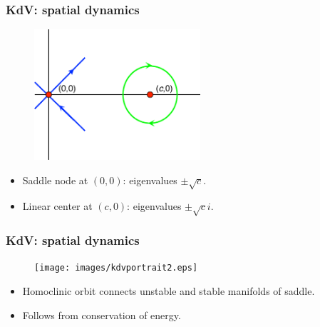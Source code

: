 \documentclass[16pt]{beamer}
\begin{document}
\begin{frame}
\frametitle{KdV: spatial dynamics}
\fontsize{16}{7.2}\selectfont
\begin{figure}[H]
\includegraphics[width=0.55\textwidth]{images/kdv3portrait1.eps}
\end{figure}
\begin{itemize}
\item Saddle node at $(0,0)$: eigenvalues $\pm \sqrt{c}$.
\vspace{0.25ex}
\item Linear center at $(c, 0)$: eigenvalues $\pm \sqrt{c} i$.
\end{itemize}
\end{frame}

\begin{frame}
\frametitle{KdV: spatial dynamics}
\fontsize{16}{7.2}\selectfont
\begin{figure}[H]
\texttt{[image: images/kdvportrait2.eps]}
\end{figure}
\begin{itemize}
\item Homoclinic orbit connects unstable and stable manifolds of saddle.
\vspace{0.25ex}
\item Follows from conservation of energy.
\end{itemize}
\end{frame}
\end{document}
